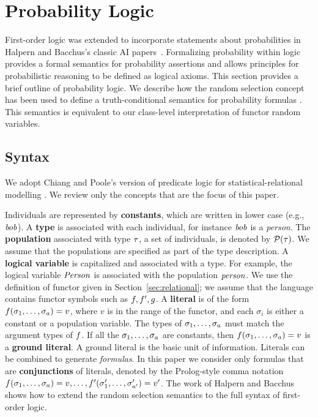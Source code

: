 \documentclass[oribibl]{llncs}
\begin{document}
\section{Probability Logic}\label{sec:probability-logic}
First-order logic was extended to incorporate statements about probabilities
in Halpern and Bacchus's classic AI papers~\cite{Halpern90,Bacchus90}. %
Formalizing probability within logic provides a formal semantics for probability assertions and allows principles for probabilistic reasoning to be defined as logical axioms. This section provides a brief outline of probability logic. We describe how the random selection concept has been used to define a truth-conditional semantics for probability formulas \cite{Halpern90,Bacchus90}. This semantics is equivalent to our class-level interpretation of functor random variables. 

\subsection{Syntax} We adopt Chiang and Poole's version of predicate logic for statistical-relational modelling \cite{Chiang2012}. 
We review only the concepts that are the focus of this paper.

 Individuals are represented by {\bf constants}, which are written in lower case (e.g., $\it{bob}$). A \textbf{type} is associated with each individual, for instance $\it{bob}$ is a {\em person}. The \textbf{population} associated with type $\tau$, a set of individuals, is denoted by $\mathcal{P}(\tau)$. We assume that the populations are specified as part of the type description.
A \textbf{logical variable} is capitalized and associated with a type.  For example, the logical variable $\it{Person}$ is associated with the population $\it{person}$. We use the definition of functor given in Section~\ref{sec:relational}; we assume that the language contains functor symbols such as $f,f',g$. 
A \textbf{literal} is of the form $f(\sigma_{1},\ldots,\sigma_{a}) = v$, where $v$ is in the range of the functor, and each $\sigma_{i}$ is either a constant or a population variable. The types of $\sigma_{1},\ldots,\sigma_{a}$ must match the argument types of $f$. If all the $\sigma_{1},\ldots,\sigma_{a}$ are constants, then $f(\sigma_{1},\ldots,\sigma_{a}) = v$ is a \textbf{ground literal}. A ground literal is the basic unit of information. Literals can be combined to generate {\em formulas}. In this paper we consider only formulas that are \textbf{conjunctions} of literals, denoted by the Prolog-style comma notation $f(\sigma_{1},\ldots,\sigma_{a}) = v, \ldots,f'(\sigma'_{1},\ldots,\sigma'_{a'}) = v'$. The work of Halpern and Bacchus shows how to extend the random selection semantics to the full syntax of first-order logic. 
\end{document}
